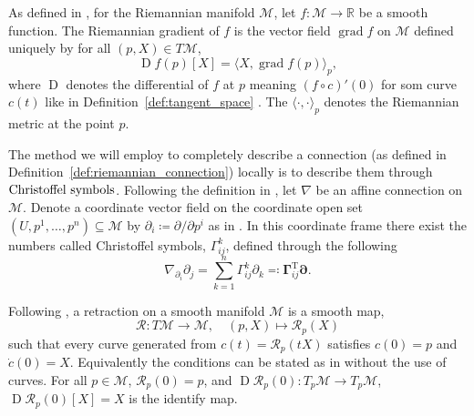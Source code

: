 \begin{definition}\label{def:riemannian_gradient}
    As defined in \cite[Def.~3.58]{Boumal2023}, for the Riemannian manifold $\mathcal{M}$, let $f\colon\mathcal{M}\to \mathbb{R}$ be a smooth function. The \textup{Riemannian gradient} of $f$ is the vector field $\operatorname{grad}f$ on $\mathcal{M}$ defined uniquely by for all $(p,X)\in T\mathcal{M}$,
    \begin{equation*}
    \operatorname{D}f(p)[X]=\langle X,\operatorname{grad}f(p) \rangle _{p},
    \end{equation*}
    where $\operatorname{D}$ denotes the differential of $f$ at $p$ meaning $(f\circ c)'(0)$ for som curve $c(t)$ like in Definition~\ref{def:tangent_space} \cite[Def.~3.34]{Boumal2023}. The $\langle \cdot,\cdot \rangle_{p}$ denotes the Riemannian metric at the point $p$. 
\end{definition}

\begin{definition}\label{def:christoffel_symbols}
    The method we will employ to completely describe a connection (as defined in Definition~\ref{def:riemannian_connection}) locally is to describe them through $\textup{Christoffel symbols}$. Following the definition in \cite[p.~100]{Tu2017}, let $\nabla$ be an affine connection on $\mathcal{M}$. Denote a coordinate vector field on the coordinate open set $(U,p^{1},\dots,p^{n})\subseteq\mathcal{M}$ by $\partial_{i}\coloneqq \partial/\partial p^i$ as in \cite[Appendix~A.3]{Tu2017}. In this coordinate frame there exist the numbers called Christoffel symbols, $\Gamma_{ij}^{k}$, defined through the following
    \begin{equation*}
        \nabla_{\partial_{i}}\partial_{j}=\sum\limits_{k=1}^{n}\Gamma_{ij}^{k}\partial_{k}\eqqcolon\boldsymbol{\Gamma}_{ij}^{\mathrm{T}}\boldsymbol{\partial}.    
    \end{equation*}
\end{definition}

\begin{definition}[Retraction]\label{def:retraction}
    Following \cite[Def.~3.47]{Boumal2023}, a retraction on a smooth manifold $\mathcal{M}$ is a smooth map,
    $$\mathcal{R}\colon T \mathcal{M}\xrightarrow{}\mathcal{M},\quad(p,X)\mapsto \mathcal{R}_{p}(X)$$
    such that every curve generated from $c(t)=\mathcal{R}_{p}(tX)$ satisfies $c(0)=p$ and $\dot{c}(0)=X$. Equivalently the conditions can be stated as in \cite[p.~40]{Boumal2023} without the use of curves. For all $p\in \mathcal{M}$, $\mathcal{R}_{p}(0)=p$, and $\operatorname{D}\mathcal{R}_{p}(0)\colon T_{p}\mathcal{M}\xrightarrow{}T_{p}\mathcal{M}$, $\operatorname{D}\mathcal{R}_{p}(0)[X]=X$ is the identify map. 
\end{definition}

